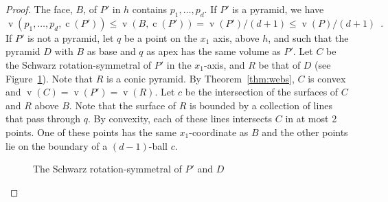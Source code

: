 \documentclass[preprint, 12pt]{elsarticle}
\DeclareMathOperator{\vol}{v}
\DeclareMathOperator{\cog}{c}
\begin{document}
\begin{proof}
The face, $B$, of $P'$ in $h$ contains $p_1,\ldots,p_d$. If $P'$ is a pyramid, we have 
\[
\vol(p_1,\ldots,p_d,\cog(P'))
   \le \vol(B,\cog(P')) 
   = \vol(P')/(d+1) \le \vol(P)/(d+1)\enspace .
\]
If $P'$ is not a pyramid, let $q$ be a
point on the $x_1$ axis, above $h$, and such that the pyramid $D$ with
$B$ as base and $q$ as apex has the same volume as $P'$.  Let $C$ be the
Schwarz rotation-symmetral of $P'$ in the $x_{1}$-axis, and $R$ be that
of $D$ (see Figure~\ref{fig:rotsym}). Note that $R$ is a conic pyramid.
By Theorem~\ref{thm:webs}, $C$ is convex and $\vol(C) = \vol(P') =
\vol(R)$. Let $c$ be the intersection of the surfaces of $C$ and $R$
above $B$. Note that the surface of $R$ is bounded by a collection of
lines that pass through $q$.  By convexity, each of these lines intersects $C$ in at
most 2 points.  One of these points has the same $x_1$-coordinate as $B$
and the other points lie on the boundary of a $(d-1)$-ball $c$.
\begin{figure}[ht]
  \centering
  \hspace{5mm}
  \caption{The Schwarz rotation-symmetral of $P'$ and $D$}
  \label{fig:rotsym}
\end{figure}


\end{proof}
\end{document}
